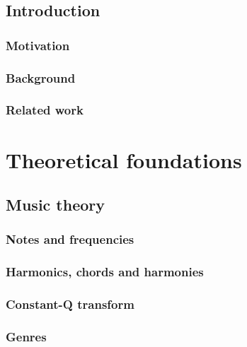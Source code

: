 \documentclass[a4paper,12pt,twoside]{report}
\begin{document}
\chapter*{Introduction}

\section*{Motivation}

\section*{Background}
\label{background}

\section*{Related work}

\part{Theoretical foundations}

\chapter{Music theory}

\section{Notes and frequencies}

\section{Harmonics, chords and harmonies}

\section{Constant-Q transform}

\section{Genres}
\end{document}

